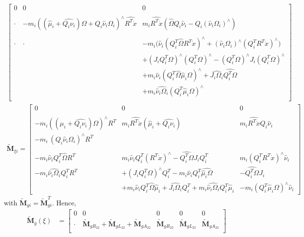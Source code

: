 \documentclass[10pt]{article}
\begin{document}
\begin{itemize}
\begin{align*}
\begin{bmatrix}
	0 & 0 & 0 \\\\
	\cdot & -m_i ((\hat\mu_i+\widehat{Q_i\nu_i})\Omega + Q_i\hat\nu_i\Omega_i)^\wedge \widehat{R^T\dot{x}} & m_i \widehat{R^T\dot{x}} (\hat{\Omega} Q_i \hat{\nu}_i - Q_i(\hat{\nu}_i\Omega_i)^\wedge) \\\\
	\cdot & \cdot & -m_i \bigl( \hat\nu_i (Q_i^T \hat{\Omega} R^T \dot{x})^\wedge + (\hat{\nu}_i\Omega_i)^\wedge (Q_i^T R^T \dot{x})^\wedge \bigr) \\
	& & + (J_i Q_i^T \Omega)^\wedge (Q_i^T \Omega)^\wedge -(Q_i^T \Omega)^\wedge J_i (Q_i^T \Omega)^\wedge \\
	& & + m_i \hat\nu_i(Q_i^T \hat{\Omega}\hat\mu_i\Omega)^\wedge + \widehat{J_i \Omega_i}\widehat{Q_i^T \Omega} \\
	& & + m_i \widehat{\hat{\nu}_i\Omega_i} (Q_i^T \hat\mu_i \Omega)^\wedge \\
	\end{bmatrix}
	\\
	\tilde{\mathbf{M}}_{\xi i} = \begin{bmatrix}
	0 & 0 & 0 \\\\
	-m_i((\hat\mu_i + \widehat{Q_i\nu_i}) \Omega)^\wedge R^T &  m_i \widehat{R^T \dot{x}} (\hat{\mu}_i + \widehat{Q_i\nu_i})
	& m_i\widehat{R^T \dot{x}}Q_i\hat\nu_i\\
	-m_i \ (Q_i \hat{\nu}_i \Omega_i)^\wedge R^T  & &
	\\\\
	-m_i \hat{\nu}_iQ_i^T\hat{\Omega}R^T &  m_i \hat{\nu}_i Q_i^T (R^T \dot{x})^\wedge - \widehat{Q_i^T\Omega}J_iQ_i^T &  m_i (Q_i^T R^T \dot{x})^\wedge \hat\nu_i \\
	-m_i \widehat{\hat\nu_i\Omega_i} Q_i^T R^T & + (J_iQ_i^T\Omega)^\wedge Q_i^T -m_i\hat\nu_i Q_i^T \widehat{\hat\mu_i \Omega} & -\widehat{Q_i^T \Omega} J_i \\
	& +m_i\hat{\nu}_i Q_i^T \hat{\Omega} \hat\mu_i + \widehat{J_i\Omega_i}Q_i^T + m_i\widehat{\hat\nu_i \Omega_i} Q_i^T\hat\mu_i & - m_i(Q_i^T \hat\mu_i \Omega)^\wedge\hat\nu_i
	\end{bmatrix}
	\end{align*}
	with $ \tilde{\mathbf{M}}_{gi} = \tilde{\mathbf{M}}_{gi}^T $. Hence,
	\begin{align*}
	{\tilde{\mathbf{M}}_g}(\xi) &= \begin{bmatrix}
	0 & 0 & 0 & 0 & 0\\
	\cdot & \tilde{\mathbf{M}}_{gR_{22}} + \tilde{\mathbf{M}}_{gL_{22}} + \tilde{\mathbf{M}}_{gA_{22}} & \tilde{\mathbf{M}}_{gR_{23}} & \tilde{\mathbf{M}}_{gL_{23}} & \tilde{\mathbf{M}}_{gA_{23}} \\

\end{bmatrix}
\end{align*}
\end{itemize}
\end{document}
